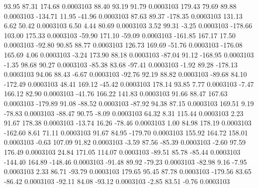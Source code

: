        93.95       87.31      174.68     0.0003103
       88.40       93.19       91.79     0.0003103
      179.43       79.69       89.88     0.0003103
     -134.71       11.95      -41.96     0.0003103
       87.63       89.37     -178.35     0.0003103
      131.13        6.62       50.42     0.0003103
        6.50        4.44       80.69     0.0003103
        3.52       99.31       -3.25     0.0003103
     -178.66      103.00      175.33     0.0003103
      -59.90      171.10      -59.09     0.0003103
     -161.85      167.17       17.50     0.0003103
      -92.80       90.85       88.77     0.0003103
      126.73      169.69      -51.76     0.0003103
     -176.08      165.69        4.06     0.0003103
       -3.24      173.90       88.18     0.0003103
      -87.04       91.12     -168.95     0.0003103
       -1.35       98.68       90.27     0.0003103
      -85.38       83.68      -97.41     0.0003103
       -1.92       89.28     -178.13     0.0003103
       94.06       88.43       -6.67     0.0003103
      -92.76       92.19       88.82     0.0003103
      -89.68       84.10     -172.49     0.0003103
       48.41      169.12      -45.42     0.0003103
      178.14       93.85        7.77     0.0003103
       -7.47      166.12       82.90     0.0003103
      -41.76      166.22      141.83     0.0003103
       91.66       88.47      167.63     0.0003103
     -179.89       91.08      -88.52     0.0003103
      -87.92       94.38       87.15     0.0003103
      169.51        9.19      -78.83     0.0003103
      -88.47       90.75       -8.09     0.0003103
       64.32        8.31      115.44     0.0003103
        2.23       91.67      178.38     0.0003103
      -13.74       16.26      -78.46     0.0003103
        1.00       84.98      178.19     0.0003103
     -162.60        8.61       71.11     0.0003103
       91.67       84.95     -179.70     0.0003103
      155.92      164.72      158.01     0.0003103
       -0.63      107.09       91.82     0.0003103
       -3.59       87.56      -85.39     0.0003103
       -2.60       97.59      176.49     0.0003103
       24.84      171.05      114.07     0.0003103
      -89.51       85.78      -85.44     0.0003103
     -144.40      164.89     -148.46     0.0003103
      -91.48       89.92      -79.23     0.0003103
      -82.98        9.16       -7.95     0.0003103
        2.33       86.71      -93.79     0.0003103
      179.65       95.45       87.78     0.0003103
     -179.56       83.65      -86.42     0.0003103
      -92.11       84.08      -93.12     0.0003103
       -2.85       83.51       -0.76     0.0003103
